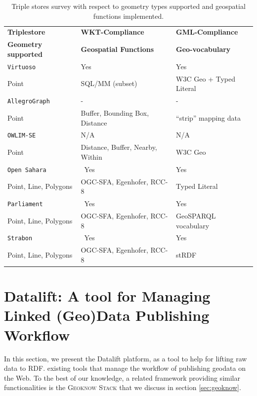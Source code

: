 \begin{table}[ht!bp]
  \caption{Triple stores survey with respect to geometry types supported and geospatial functions implemented.}
  \label{tab:triplestore}
  \centering
  \begin{tabular}{lll}
    \toprule
    \textbf{Triplestore} & \textbf{WKT-Compliance } &  \textbf{GML-Compliance } \\
    \textbf{Geometry supported} & \textbf{Geospatial Functions} &  \textbf{Geo-vocabulary} \\
    \toprule
    \texttt{Virtuoso} & Yes & Yes \\
    Point & SQL/MM (subset) & W3C Geo + Typed Literal \\
    \midrule
    \texttt{AllegroGraph} & \-- & \-- \\
    Point & Buffer, Bounding Box, Distance & ``strip'' mapping data \\
    \midrule
    \texttt{OWLIM-SE} & N/A & N/A \\
    Point & Distance, Buffer, Nearby, Within & W3C Geo \\
    \midrule
    \texttt{Open Sahara} & \ Yes & Yes \\
    Point, Line, Polygons & OGC-SFA, Egenhofer, RCC-8 & Typed Literal \\
    \midrule
    \texttt{Parliament} & \ Yes & Yes \\
    Point, Line, Polygons & OGC-SFA, Egenhofer, RCC-8 &  GeoSPARQL vocabulary\\
    \midrule
    \texttt{Strabon} & \ Yes & Yes \\
    Point, Line, Polygons & OGC-SFA, Egenhofer, RCC-8 &  stRDF\\
    \bottomrule
  \end{tabular}
\end{table}




\section{Datalift: A tool for Managing Linked (Geo)Data Publishing Workflow}
\label{sec:toolLD}
In this section, we present the Datalift platform, as a tool to help for lifting raw data to RDF. existing tools that manage the workflow of publishing geodata on the Web. To the best of our knowledge, a related framework providing similar functionalities is the \textsc{Geoknow Stack} that we discuss in section \ref{sec:geoknow}.

